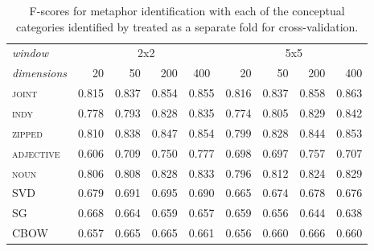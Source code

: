 

\begin{table}
\centering
\begin{tabular}{lrrrr|rrrr}
\hline
\emph{window} & \multicolumn{4}{c}{2x2} & \multicolumn{4}{c}{5x5} \\
\emph{dimensions} & 20 & 50 & 200 & \multicolumn{1}{c}{400} & 20 & 50 & 200 & 400 \\
\hline
\textsc{joint} & 0.815 & 0.837 & 0.854 & 0.855 & 0.816 & 0.837 & 0.858 & 0.863 \\
\textsc{indy} & 0.778 & 0.793 & 0.828 & 0.835 & 0.774 & 0.805 & 0.829 & 0.842 \\
\textsc{zipped} & 0.810 & 0.838 & 0.847 & 0.854 & 0.799 & 0.828 & 0.844 & 0.853 \\
\textsc{adjective} & 0.606 & 0.709 & 0.750 & 0.777 & 0.698 & 0.697 & 0.757 & 0.707 \\
\textsc{noun} & 0.806 & 0.808 & 0.828 & 0.833 & 0.796 & 0.812 & 0.824 & 0.829 \\
\textsc{SVD} & 0.679 & 0.691 & 0.695 & 0.690 & 0.665 & 0.674 & 0.678 & 0.676 \\
\textsc{SG} & 0.668 & 0.664 & 0.659 & 0.657 & 0.659 & 0.656 & 0.644 & 0.638 \\
\textsc{CBOW} & 0.657 & 0.665 & 0.665 & 0.661 & 0.656 & 0.660 & 0.666 & 0.660 \\
\hline
\end{tabular}
\caption[F-Scores for Metaphor Classification of Unseen Adjectives]{F-scores for metaphor identification with each of the conceptual categories identified by \cite{GutierrezEA2016} treated as a separate fold for cross-validation.}
\label{tab:categoraphor}
\end{table}

